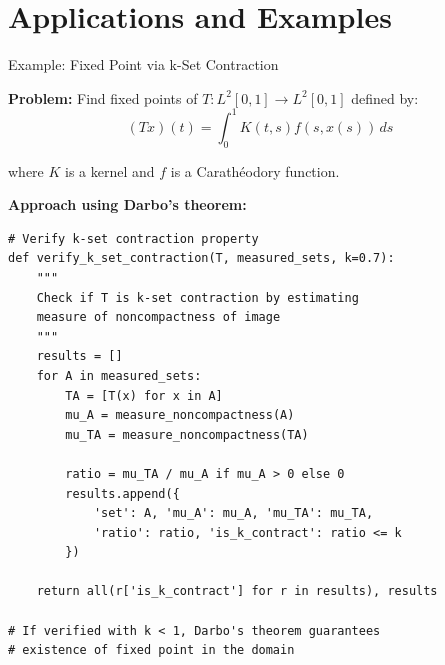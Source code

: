 \documentclass[aspectratio=169,10pt]{beamer}
\begin{document}
\section{Applications and Examples}

\begin{frame}[fragile]{Example: Fixed Point via k-Set Contraction}

\textbf{Problem:} Find fixed points of $T: L^2[0, 1] \to L^2[0, 1]$ defined by:
\[
(Tx)(t) = \int_0^1 K(t, s) f(s, x(s)) \, ds
\]

where $K$ is a kernel and $f$ is a Carathéodory function.

\vspace{0.3cm}

\textbf{Approach using Darbo's theorem:}

\begin{lstlisting}
# Verify k-set contraction property
def verify_k_set_contraction(T, measured_sets, k=0.7):
    """
    Check if T is k-set contraction by estimating
    measure of noncompactness of image
    """
    results = []
    for A in measured_sets:
        TA = [T(x) for x in A]
        mu_A = measure_noncompactness(A)
        mu_TA = measure_noncompactness(TA)

        ratio = mu_TA / mu_A if mu_A > 0 else 0
        results.append({
            'set': A, 'mu_A': mu_A, 'mu_TA': mu_TA,
            'ratio': ratio, 'is_k_contract': ratio <= k
        })

    return all(r['is_k_contract'] for r in results), results

# If verified with k < 1, Darbo's theorem guarantees
# existence of fixed point in the domain
\end{lstlisting}

\end{frame}
\end{document}
